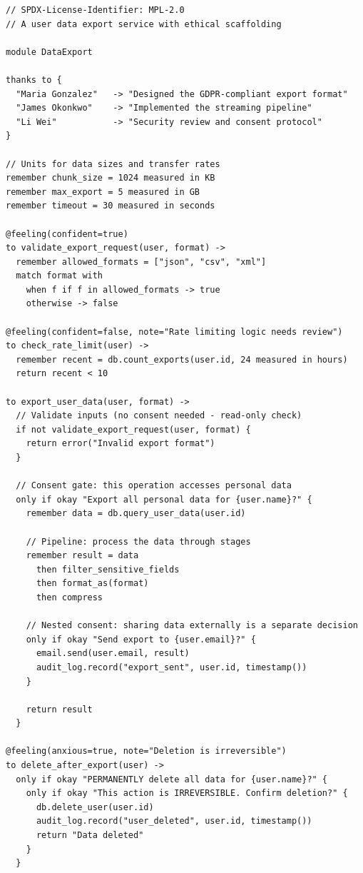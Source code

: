 \documentclass[11pt,a4paper]{article}
\begin{document}
\begin{lstlisting}[caption={Complete WokeLang program demonstrating all four constructs},label=lst:complete]
// SPDX-License-Identifier: MPL-2.0
// A user data export service with ethical scaffolding

module DataExport

thanks to {
  "Maria Gonzalez"   -> "Designed the GDPR-compliant export format"
  "James Okonkwo"    -> "Implemented the streaming pipeline"
  "Li Wei"           -> "Security review and consent protocol"
}

// Units for data sizes and transfer rates
remember chunk_size = 1024 measured in KB
remember max_export = 5 measured in GB
remember timeout = 30 measured in seconds

@feeling(confident=true)
to validate_export_request(user, format) ->
  remember allowed_formats = ["json", "csv", "xml"]
  match format with
    when f if f in allowed_formats -> true
    otherwise -> false

@feeling(confident=false, note="Rate limiting logic needs review")
to check_rate_limit(user) ->
  remember recent = db.count_exports(user.id, 24 measured in hours)
  return recent < 10

to export_user_data(user, format) ->
  // Validate inputs (no consent needed - read-only check)
  if not validate_export_request(user, format) {
    return error("Invalid export format")
  }

  // Consent gate: this operation accesses personal data
  only if okay "Export all personal data for {user.name}?" {
    remember data = db.query_user_data(user.id)

    // Pipeline: process the data through stages
    remember result = data
      then filter_sensitive_fields
      then format_as(format)
      then compress

    // Nested consent: sharing data externally is a separate decision
    only if okay "Send export to {user.email}?" {
      email.send(user.email, result)
      audit_log.record("export_sent", user.id, timestamp())
    }

    return result
  }

@feeling(anxious=true, note="Deletion is irreversible")
to delete_after_export(user) ->
  only if okay "PERMANENTLY delete all data for {user.name}?" {
    only if okay "This action is IRREVERSIBLE. Confirm deletion?" {
      db.delete_user(user.id)
      audit_log.record("user_deleted", user.id, timestamp())
      return "Data deleted"
    }
  }
\end{lstlisting}
\end{document}

